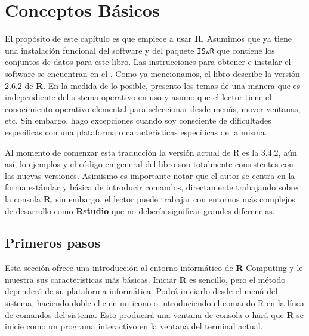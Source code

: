 \chapter{Conceptos Básicos}

El propósito de este capítulo es que empiece a usar  \textbf{R}. Asumimos que
ya tiene una instalación funcional del software y del paquete \texttt{ISwR} que
contiene los conjuntos de datos para este libro. Las instrucciones para obtener
e instalar el software se encuentran en el . Como ya
mencionamos, el libro describe la versión 2.6.2 de  \textbf{R}.  En la medida
de lo posible, presento los temas de una manera que es independiente del
sistema operativo en uso y asumo que el lector tiene el conocimiento operativo
elemental para seleccionar desde menús, mover ventanas, etc. Sin embargo, hago
excepciones cuando soy consciente de dificultades específicas con una
plataforma o características específicas de la misma.

\begin{tradnote}
	Al momento de comenzar esta traducción la versión actual de R es la
	3.4.2, aún así, lo ejemplos y el código en general del libro son totalmente
	consistentes con las nuevas versiones. Asimismo es importante notar que el
	autor se centra en la forma estándar y básica de introducir comandos,
	directamente trabajando sobre la consola \textbf{R}, sin embargo, el lector
	puede trabajar con entornos más complejos de desarrollo como
	\textbf{Rstudio} que no debería significar grandes diferencias.
\end{tradnote}

\section{Primeros pasos}

Esta sección ofrece una introducción al entorno informático de  \textbf{R}
Computing y le muestra sus características más básicas. Iniciar  \textbf{R} es
sencillo, pero el método dependerá de su plataforma informática.  Podrá
iniciarlo desde el menú del sistema, haciendo doble clic en un icono o
introduciendo el comando \textquotedbl{}R\textquotedbl{} en la línea de
comandos del sistema. Esto producirá una ventana de consola o hará que
\textbf{R} se inicie como un programa interactivo en la ventana del terminal
actual.

